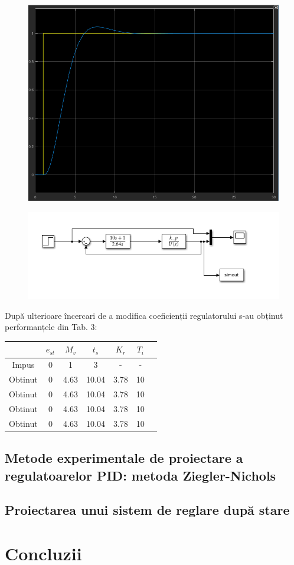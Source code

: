 \documentclass{article}
\begin{document}
\begin{figure}[H]
	\centering
	\begin{minipage}{.4\textwidth}
		\centering
		\includegraphics[width=.9\linewidth]{CMVK.png}
		\label{fig:test1}
	\end{minipage}%
	\begin{minipage}{.6\textwidth}
		\centering
		\includegraphics[width=.9\linewidth]{sim_cmvk.png}
		\label{fig:test2}
	\end{minipage}
\end{figure}
După ulterioare încercari de a modifica coeficienții regulatorului s-au obținut performanțele din Tab. 3:
\begin{center}
	\begin{tabular}{|c|c|c|c|c|c|c|}
		\hline
		&$e_{st}$&$M_v$&$t_s$&$K_r$&$T_i$\\
		\hline
		Impus&0&1&3&-&-\\
		\hline
		Obtinut&0&4.63&10.04&3.78&10\\
		Obtinut&0&4.63&10.04&3.78&10\\
		Obtinut&0&4.63&10.04&3.78&10\\
		Obtinut&0&4.63&10.04&3.78&10\\
		\hline
	\end{tabular}
\end{center}
\subsection{Metode experimentale de proiectare a regulatoarelor PID: metoda Ziegler-Nichols}
\subsection{Proiectarea unui sistem de reglare după stare}
\newpage

\section{Concluzii}

\newpage


\end{document}
